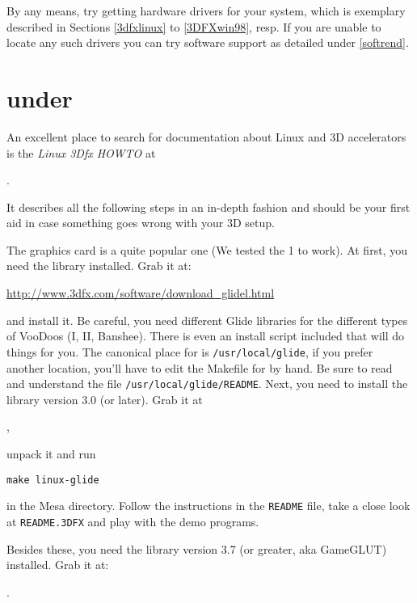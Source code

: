 By any means, try getting hardware  drivers for your system, which is
exemplary described in Sections \ref{3dfxlinux} to \ref{3DFXwin98}, resp. If you are
unable to locate any such drivers you can try software support as detailed under \ref{softrend}.

\section{ under \label{3dfxlinux}}

An excellent place to search for documentation about Linux and 3D
accelerators is the {\it Linux 3Dfx HOWTO} at

.

It describes all the following steps in an in-depth fashion and
should be your first aid in case something goes wrong with your 3D
setup.

The  graphics card is a quite popular one (We tested
the 1 to work). At first, you need the 
library installed. Grab it at:

\href{http://www.3dfx.com/software/download_glidel.html}{http://www.3dfx.com/software/download\_glidel.html}

 \noindent
and install it.
Be careful, you need different Glide libraries for the different types of VooDoos (I, II, Banshee).
There is even an install script included that will do things for you. The canonical place
for  is \texttt{/usr/local/glide}, if you prefer another location, you'll
have to edit the Makefile for \FlightGear by hand. Be sure to read and understand the
file \texttt{/usr/local/glide/README}. Next, you need to install the  library
version 3.0 (or later). Grab it at

 ,

 \noindent
unpack it and run

  \texttt{make linux-glide}

 \noindent
in the Mesa directory. Follow the instructions in the \texttt{README}
file, take a close look at \texttt{README.3DFX} and play with the demo
programs.

Besides these, you need the  library version 3.7 (or
greater, aka GameGLUT) installed. Grab it at:

   .

